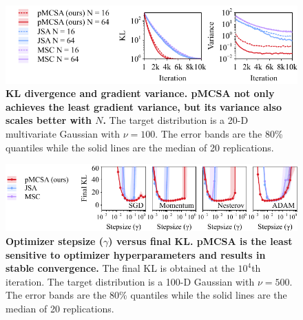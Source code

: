 

\begin{figure}
  \vspace{-0.25in}
  \centering
  \includegraphics[scale=1.0]{figures/gaussian_02.pdf}
  \vspace{-0.07in}
  \caption{\textbf{
      KL divergence and gradient variance.
      pMCSA not only achieves the least gradient variance, but its variance also scales better with \(N\).
    }
    The target distribution is a 20-D multivariate Gaussian with \(\nu = 100\).
    The error bands are the 80\% quantiles while the solid lines are the median of 20 replications.
  }\label{fig:gaussian}
\end{figure}
\begin{figure}
  \vspace{-0.13in}
  \centering
  \includegraphics[scale=1.0]{figures/stepsize_02.pdf}
  \caption{\textbf{Optimizer stepsize (\(\gamma\)) versus final KL.
      pMCSA is the least sensitive to optimizer hyperparameters and results in stable convergence.}
      The final KL is obtained at the \(10^4\)th iteration.
      The target distribution is a 100-D Gaussian with \(\nu = 500\).
      The error bands are the 80\% quantiles while the solid lines are the median of 20 replications.
  }\label{fig:stepsize}
  \vspace{-0.15in}
\end{figure}


